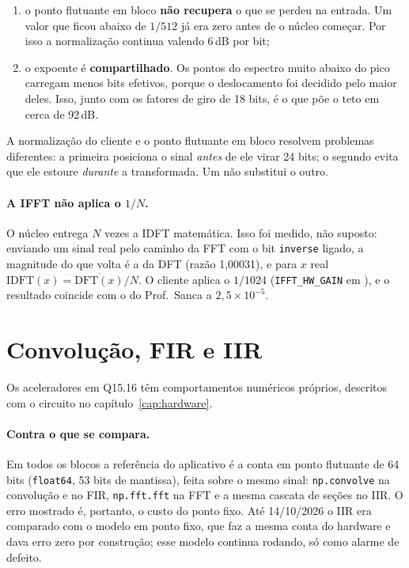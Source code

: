 \begin{enumerate}
  \item o ponto flutuante em bloco \textbf{não recupera} o que se perdeu na
    entrada. Um valor que ficou abaixo de \(1/512\) já era zero antes de o
    núcleo começar. Por isso a normalização continua valendo 6\,dB por bit;
  \item o expoente é \textbf{compartilhado}. Os pontos do espectro muito abaixo
    do pico carregam menos bits efetivos, porque o deslocamento foi decidido
    pelo maior deles. Isso, junto com os fatores de giro de 18 bits, é o que
    põe o teto em cerca de 92\,dB.
\end{enumerate}

A normalização do cliente e o ponto flutuante em bloco resolvem problemas
diferentes: a primeira posiciona o sinal \emph{antes} de ele virar 24 bits; o
segundo evita que ele estoure \emph{durante} a transformada. Um não substitui o
outro.

\paragraph{A IFFT não aplica o \(1/N\).} O núcleo entrega \(N\) vezes a IDFT
matemática. Isso foi medido, não suposto: enviando um sinal real pelo caminho
da FFT com o bit \texttt{inverse} ligado, a magnitude do que volta é a da DFT
(razão 1,00031), e para \(x\) real
\(\mathrm{IDFT}(x) = \overline{\mathrm{DFT}(x)}/N\). O cliente aplica o
\(1/1024\) (\texttt{IFFT\_HW\_GAIN} em ), e o resultado
coincide com o  do Prof.\ Sanca a \(2{,}5\times10^{-5}\).

\section{Convolução, FIR e IIR}

Os aceleradores em Q15.16 têm comportamentos numéricos próprios, descritos com
o circuito no capítulo~\ref{cap:hardware}.

\paragraph{Contra o que se compara.} Em todos os blocos a referência do
aplicativo é a conta em ponto flutuante de 64 bits (\texttt{float64}, 53 bits de
mantissa), feita sobre o mesmo sinal: \texttt{np.convolve} na convolução e no
FIR, \texttt{np.fft.fft} na FFT e a mesma cascata de seções no IIR. O erro
mostrado é, portanto, o custo do ponto fixo. Até 14/10/2026 o IIR era comparado
com o modelo em ponto fixo, que faz a mesma conta do hardware e dava erro zero
por construção; esse modelo continua rodando, só como alarme de defeito.

